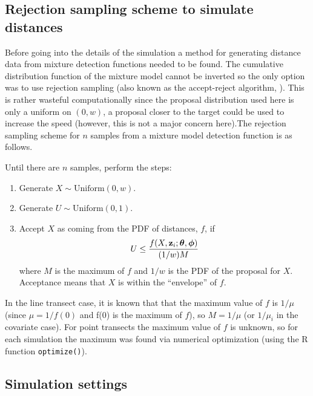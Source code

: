 \subsection{Rejection sampling scheme to simulate distances}

Before going into the details of the simulation a method for generating distance data from mixture detection functions needed to be found. The cumulative distribution function of the mixture model cannot be inverted so the only option was to use rejection sampling (also known as the accept-reject algorithm, \cite[pp. 51-53]{montecarlostats}). This is rather wasteful computationally since the proposal distribution used here is only a uniform on $(0,w)$, a proposal closer to the target could be used to increase the speed (however, this is not a major concern here).The rejection sampling scheme for $n$ samples from a mixture model detection function is as follows. 

Until there are $n$ samples, perform the steps:
\begin{enumerate}
\item Generate $X \sim \text{Uniform}(0,w)$. 
\item Generate $U \sim \text{Uniform}(0,1)$.
\item Accept $X$ as coming from the PDF of distances, $f$, if 
\begin{equation*}
U \leq \frac{f(X,\mathbf{z}_i; \bm{\theta}, \bm{\phi})}{(1/w) M}\\
\end{equation*}
where $M$ is the maximum of $f$ and $1/w$ is the PDF of the proposal for $X$. Acceptance means that $X$ is within the ``envelope'' of $f$.
\end{enumerate}

In the line transect case, it is known that that the maximum value of $f$ is $1/\mu$ (since $\mu=1/f(0)$ and f(0) is the maximum of $f$), so $M=1/\mu$ (or $1/\mu_i$ in the covariate case). For point transects the maximum value of $f$ is unknown, so for each simulation the maximum was found via numerical optimization (using the \textsf{R} function \texttt{optimize()}). 

\subsection{Simulation settings}


